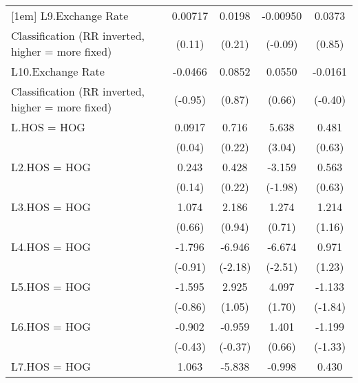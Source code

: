 {\begin{tabular}{l*{4}{c}}
[1em]
L9.Exchange Rate    &     0.00717         &      0.0198         &    -0.00950         &      0.0373         \\
Classification (RR inverted, higher = more fixed)&      (0.11)         &      (0.21)         &     (-0.09)         &      (0.85)         \\
[1em]
L10.Exchange Rate   &     -0.0466         &      0.0852         &      0.0550         &     -0.0161         \\
Classification (RR inverted, higher = more fixed)&     (-0.95)         &      (0.87)         &      (0.66)         &     (-0.40)         \\
[1em]
L.HOS = HOG         &      0.0917         &       0.716         &       5.638\sym{**} &       0.481         \\
                    &      (0.04)         &      (0.22)         &      (3.04)         &      (0.63)         \\
[1em]
L2.HOS = HOG        &       0.243         &       0.428         &      -3.159\sym{*}  &       0.563         \\
                    &      (0.14)         &      (0.22)         &     (-1.98)         &      (0.63)         \\
[1em]
L3.HOS = HOG        &       1.074         &       2.186         &       1.274         &       1.214         \\
                    &      (0.66)         &      (0.94)         &      (0.71)         &      (1.16)         \\
[1em]
L4.HOS = HOG        &      -1.796         &      -6.946\sym{*}  &      -6.674\sym{*}  &       0.971         \\
                    &     (-0.91)         &     (-2.18)         &     (-2.51)         &      (1.23)         \\
[1em]
L5.HOS = HOG        &      -1.595         &       2.925         &       4.097         &      -1.133         \\
                    &     (-0.86)         &      (1.05)         &      (1.70)         &     (-1.84)         \\
[1em]
L6.HOS = HOG        &      -0.902         &      -0.959         &       1.401         &      -1.199         \\
                    &     (-0.43)         &     (-0.37)         &      (0.66)         &     (-1.33)         \\
[1em]
L7.HOS = HOG        &       1.063         &      -5.838         &      -0.998         &       0.430         \\

\end{tabular}}
